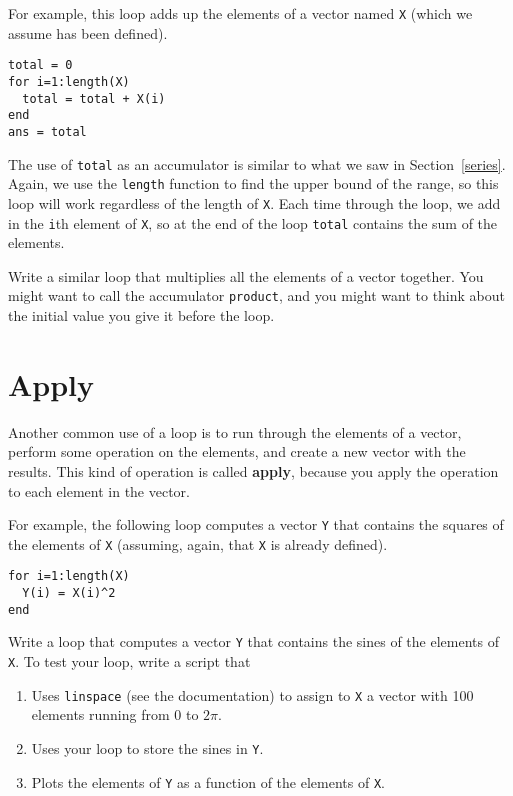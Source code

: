 For example, this loop adds up the elements of a vector named {\tt X}
(which we assume has been defined).

\begin{verbatim}
total = 0
for i=1:length(X)
  total = total + X(i)
end
ans = total
\end{verbatim}

The use of {\tt total} as an accumulator is similar to what we
saw in Section~\ref{series}. Again, we use the {\tt length} function
to find the upper bound of the range, so this loop will work
regardless of the length of {\tt X}.
Each time through the loop, we add
in the {\tt i}th element of {\tt X}, so at the end of the loop
{\tt total} contains the sum of the elements.

\begin{ex}
Write a similar loop that multiplies all the
elements of a vector together. You might want to call the
accumulator {\tt product}, and you might want to think about 
the initial value you give it before the loop.
\end{ex}


\section{Apply}
\label{apply}

Another common use of a loop is to run through the elements of
a vector, perform some operation on the elements, and create
a new vector with the results. This kind of operation is called
{\bf apply}, because you apply the operation to each element in
the vector.

For example, the following loop computes a vector {\tt Y} that
contains the squares of the elements of {\tt X} (assuming, again,
that {\tt X} is already defined).

\begin{verbatim}
for i=1:length(X)
  Y(i) = X(i)^2
end
\end{verbatim}

\begin{ex}
Write a loop that computes a vector {\tt Y} that
contains the sines of the elements of {\tt X}. To test your
loop, write a script that

\begin{enumerate}

\item Uses {\tt linspace} (see the documentation) to assign
to {\tt X} a vector with 100 elements running from 0 to $2 \pi$.

\item Uses your loop to store the sines in {\tt Y}.

\item Plots the elements of {\tt Y} as a function of the elements
of {\tt X}.

\end{enumerate}
\end{ex}

